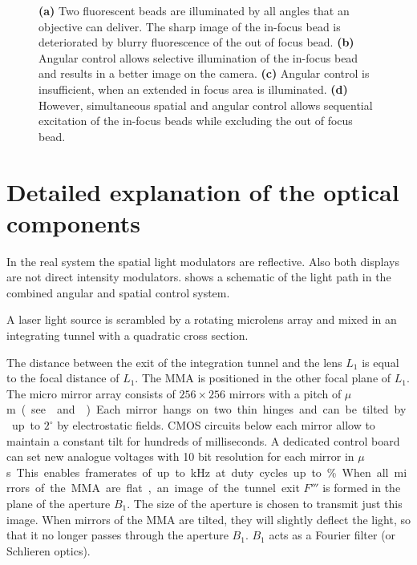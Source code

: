 \begin{figure}[!hbt]
  \centering
  \def\svgscale{.43}
  
  \caption{{\bf (a)} Two fluorescent beads are illuminated by all
    angles that an objective can deliver. The sharp image of the
    in-focus bead is deteriorated by blurry fluorescence of the out of
    focus bead. {\bf (b)} Angular control allows selective
    illumination of the in-focus bead and results in a better image on
    the camera. {\bf (c)} Angular control is insufficient, when an
    extended in focus area is illuminated. {\bf (d)} However,
    simultaneous spatial and angular control allows sequential
    excitation of the in-focus beads while excluding the out of focus
    bead.}
  \label{fig:hourglass-all}
\end{figure}
\newpage
\section{Detailed explanation of the optical components}

In the real system the spatial light modulators are reflective. 
Also both displays are not direct intensity modulators.
 shows a schematic of the light path in
the combined angular and spatial control system.

A laser light source is scrambled by a rotating microlens array and
mixed in an integrating tunnel with a quadratic cross section.

The distance between the exit of the integration tunnel and the lens
$L_1$ is equal to the focal distance of $L_1$. The MMA is positioned
in the other focal plane of $L_1$. The micro mirror array
\citep{Berndt} consists of $256\times 256$ mirrors with a pitch of
\unit[16]{$\mu$m} (see  and
). Each mirror hangs on two thin hinges and
can be tilted by up to $2^\circ$ by electrostatic fields. CMOS
circuits below each mirror allow to maintain a constant tilt for
hundreds of milliseconds. A dedicated control board can set new
analogue voltages with 10 bit resolution for each mirror in
\unit[850]{$\mu$s}. This enables framerates of up to \unit[1]{kHz} at
duty cycles up to \unit[50]{\%}.

When all mirrors of the MMA are flat, an image of the tunnel exit $F'''$
is formed in the plane of the aperture $B_1$. The size of the aperture
is chosen to transmit just this image. When mirrors of the MMA are
tilted, they will slightly deflect the light, so that it no longer
passes through the aperture $B_1$. $B_1$ acts as a Fourier filter (or
Schlieren optics).

